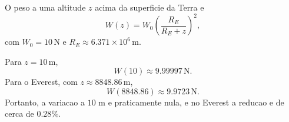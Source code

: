 O peso a uma altitude $z$ acima da superficie da Terra e
\[
W(z)=W_0\left(\frac{R_E}{R_E+z}\right)^2,
\]
com $W_0=10\,\text{N}$ e $R_E\approx 6.371\times 10^6\,\text{m}$.

Para $z=10\,\text{m}$,
\[
W(10) \approx 9.99997\,\text{N}.
\]
Para o Everest, com $z\approx 8848.86\,\text{m}$,
\[
W(8848.86) \approx 9.9723\,\text{N}.
\]
Portanto, a variacao a $10$ m e praticamente nula, e no Everest a reducao e de cerca de $0.28\%$.

